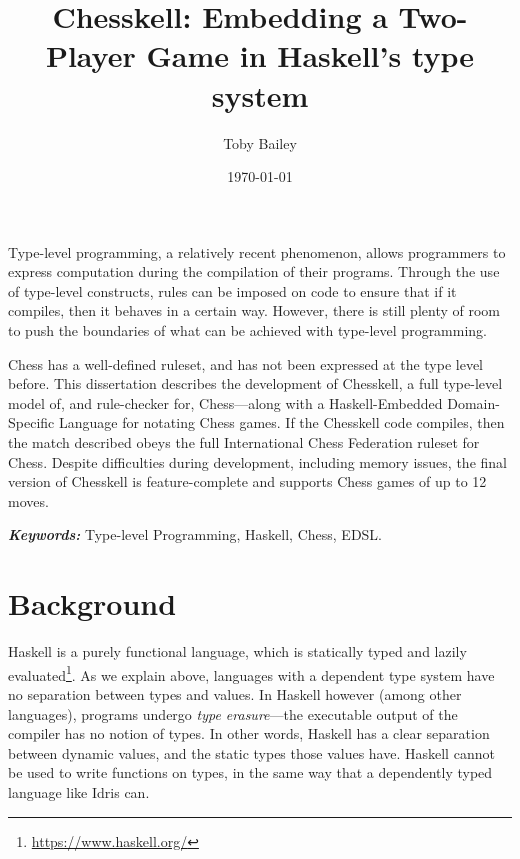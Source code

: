 \documentclass[12pt, a4paper, bibliography=totocnumbered]{scrreprt}
\title{Chesskell: Embedding a Two-Player Game in Haskell's type system}
\author{Toby Bailey}
\date{\today}
\renewenvironment{abstract}
 {\small
  \begin{center}
  \bfseries \textit{\abstractname}\vspace{-.5em}\vspace{0pt}
  \end{center}
  \quotation}
 {\endquotation}
\begin{document}
\begin{titlepage}
    \maketitle
\end{titlepage}

{}
\begin{abstract}
    Type-level programming, a relatively recent phenomenon, allows programmers to express computation during the compilation of their programs. Through the use of type-level constructs, rules can be imposed on code to ensure that if it compiles, then it behaves in a certain way. However, there is still plenty of room to push the boundaries of what can be achieved with type-level programming.

    Chess has a well-defined ruleset, and has not been expressed at the type level before. This dissertation describes the development of Chesskell, a full type-level model of, and rule-checker for, Chess---along with a Haskell-Embedded Domain-Specific Language for notating Chess games. If the Chesskell code compiles, then the match described obeys the full International Chess Federation ruleset for Chess. Despite difficulties during development, including memory issues, the final version of Chesskell is feature-complete and supports Chess games of up to 12 moves.

    \textbf{\textit{Keywords:}} Type-level Programming, Haskell, Chess, EDSL.
\end{abstract}

{
\newpage  %
{}
\renewcommand{\normalfont}{\usekomafont{sectioning}}
}





\chapter{Background}

Haskell is a purely functional language, which is statically typed and lazily evaluated\footnote{\url{https://www.haskell.org/}}. As we explain above, languages with a dependent type system have no separation between types and values. In Haskell however (among other languages), programs undergo \emph{type erasure}---the executable output of the compiler has no notion of types. In other words, Haskell has a clear separation between dynamic values, and the static types those values have. Haskell cannot be used to write functions on types, in the same way that a dependently typed language like Idris can.
\end{document}
